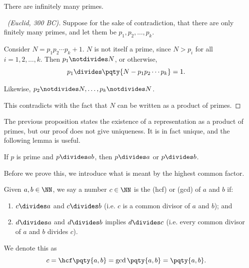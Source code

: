 \begin{theorem}
    There are infinitely many primes.
\end{theorem}

\begin{proof}[\proofname\ (Euclid, 300 BC)]
    Suppose for the sake of contradiction, that there are only finitely many primes, and let them be \(p_1, p_2, \ldots, p_k\).

    Consider \(N = p_1 p_2 \cdots p_k + 1\). \(N\) is not itself a prime, since \(N > p_i\) for all \(i = 1, 2, \ldots, k\). Then \(p_1 \notdivides N\), or otherwise,
    \[
        p_1 \divides \pqty{N - p_1 p_2 \cdots p_k} = 1.
    \]

    Likewise, \(p_2 \notdivides N, \ldots, p_k \notdivides N\).

    This contradicts with the fact that \(N\) can be written as a product of primes.
\end{proof}

The previous proposition states the existence of a representation as a product of primes, but our proof does not give uniqueness. It is in fact unique, and the following lemma is useful.

\begin{proposition}
    \label{prop:euclids-lemma}%
    If \(p\) is prime and \(p \divides ab\), then \(p \divides a\) or \(p \divides b\).
\end{proposition}

Before we prove this, we introduce what is meant by the highest common factor.

\begin{definition}
    Given \(a, b \in \NN\), we say a number \(c \in \NN\) is the  (hcf) or  (gcd) of \(a\) and \(b\) if:
    \begin{enumerate}
        \item \(c \divides a\) and \(c \divides b\) (i.e. \(c\) is a common divisor of \(a\) and \(b\)); and
        \item \(d \divides a\) and \(d \divides b\) implies \(d \divides c\) (i.e. every common divisor of \(a\) and \(b\) divides \(c\)).
    \end{enumerate}

    We denote this as
    \[
        c = \hcf\pqty{a, b} = \gcd\pqty{a, b} = \pqty{a, b}.
    \]
\end{definition}

